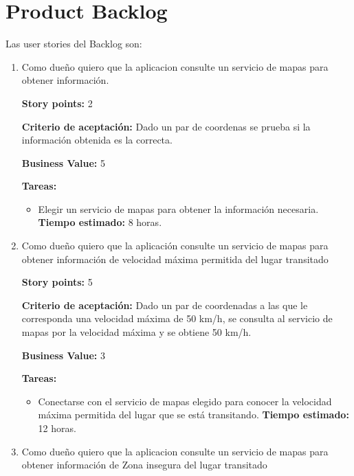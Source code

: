 \section{Product Backlog}

Las user stories del Backlog son:
\begin{enumerate}






\item Como dueño quiero que la aplicacion consulte un servicio de mapas para obtener información.

\textbf{Story points:} 2

\textbf{Criterio de aceptación:}
Dado un par de coordenas se prueba si la información obtenida es la correcta.

\textbf{Business Value:} 5

\textbf{Tareas:}
	\begin{itemize}
		\item Elegir un servicio de mapas para obtener la información necesaria.
		\newline \textbf{Tiempo estimado:} 8 horas.
	\end{itemize}






\item Como dueño quiero que la aplicación consulte un servicio de mapas para obtener información de velocidad máxima permitida del lugar transitado

\textbf{Story points:} 5

\textbf{Criterio de aceptación:}
Dado un par de coordenadas a las que le corresponda una velocidad máxima de 50 km/h, se consulta al servicio de mapas por la velocidad máxima y se obtiene 50 km/h.

\textbf{Business Value:} 3

\textbf{Tareas:}
	\begin{itemize}
		\item Conectarse con el servicio de mapas elegido para conocer la velocidad máxima permitida del lugar que se está transitando.
		\newline \textbf{Tiempo estimado:} 12 horas.
	\end{itemize}






\item Como dueño quiero que la aplicacion consulte un servicio de mapas para obtener información de Zona insegura del lugar transitado


\end{enumerate}
